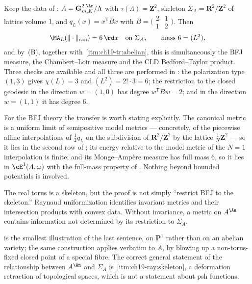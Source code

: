 \begin{example}
\label{ex:ch31-abelian-surface-bfj}
Keep the data of :
\(A=\mathbf G_{m,K}^{2,\An}/\Lambda\) with
\(\tau(\Lambda)=\mathbf Z^2\), skeleton
\(\Sigma_A=\mathbf R^2/\mathbf Z^2\) of lattice volume \(1\), and
\(q_L(x)=x^{\mathsf T}Bx\) with
\(B=\bigl(\begin{smallmatrix}2&1\\1&2\end{smallmatrix}\bigr)\).  Then
\[
 \MA_L(\|\cdot\|_{\mathrm{can}})=6\,\rd x
 \quad\text{on }\Sigma_A,
 \qquad\text{mass }6=(L^2),
\]
and by \,(B), together with
\,\cref{itm:ch19-tr:abelian}, this is simultaneously
the BFJ measure, the Chambert--Loir measure and the CLD Bedford--Taylor
product.  Three checks are available and all three are performed in
: the polarization type
\((1,3)\) gives \(\chi(L)=3\) and \((L^2)=2!\cdot3=6\); the restriction to
the closed geodesic in the direction \(w=(1,0)\) has degree
\(w^{\mathsf T}Bw=2\); and in the direction \(w=(1,1)\) it has degree \(6\).

For the BFJ theory the transfer is worth stating explicitly.  The canonical
metric is a uniform limit of semipositive model metrics --- concretely, of
the piecewise affine interpolations of \(\tfrac12q_L\) on the subdivision of
\(\mathbf R^2/\mathbf Z^2\) by the lattice \(\tfrac1N\mathbf Z^2\) --- so
it lies in the second row of ; its energy
relative to the model metric of the \(N=1\) interpolation is finite; and its
Monge--Amp\`ere measure has full mass \(6\), so it lies in
\(\cE^1(A,\omega)\) with the full-mass property of
.  Nothing beyond bounded potentials is
involved.
\end{example}

\begin{remark}
\label{rem:ch31-abelian-not-restriction}
The real torus is a skeleton, but the proof is not simply ``restrict BFJ to
the skeleton.''  Raynaud uniformization identifies invariant metrics and
their intersection products with convex data.  Without invariance, a metric
on \(A^{\An}\) contains information not determined by its restriction to
\(\Sigma_A\).

 is the smallest illustration of the last
sentence, on \(\mathbf P^1\) rather than on an abelian variety; the same
construction applies verbatim to \(A\), by blowing up a non-torus-fixed
closed point of a special fibre.  The correct general statement of the
relationship between \(A^{\An}\) and \(\Sigma_A\) is
\,\cref{itm:ch19-ray:skeleton}, a deformation
retraction of topological spaces, which is not a statement about psh
functions.
\end{remark}

